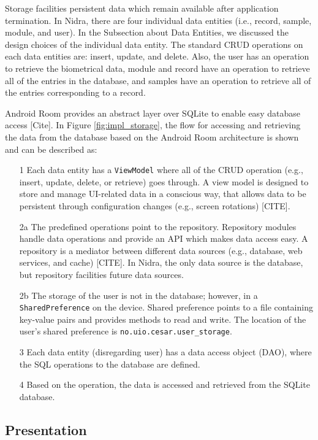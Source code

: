 Storage facilities persistent data which remain available after application termination. In Nidra, there are four individual data entities (i.e., record, sample, module, and user). In the Subsection about Data Entities, we discussed the design choices of the individual data entity. The standard CRUD operations on each data entities are: insert, update, and delete. Also, the user has an operation to retrieve the biometrical data, module and record have an operation to retrieve all of the entries in the database, and samples have an operation to retrieve all of the entries corresponding to a record. 

Android Room provides an abstract layer over SQLite to enable easy database access [Cite]. In Figure \ref{fig:impl_storage}, the flow for accessing and retrieving the data from the database based on the Android Room architecture is shown and can be described as:

\begin{itemize}
	\item[1] Each data entity has a \verb|ViewModel| where all of the CRUD operation (e.g., insert, update, delete, or retrieve) goes through.  A view model is designed to store and manage UI-related data in a conscious way, that allows data to be persistent through configuration changes (e.g., screen rotations) [CITE]. 
 	\item[2a] The predefined operations point to the repository. Repository modules handle data operations and provide an API  which makes data access easy. A repository is a mediator between different data sources (e.g., database, web services, and cache) [CITE]. In Nidra, the only data source is the database, but repository facilities future data sources. 
	\item[2b] The storage of the user is not in the database; however, in a \verb|SharedPreference| on the device. Shared preference points to a file containing key-value pairs and provides methods to read and write. The location of the user's shared preference is \verb|no.uio.cesar.user_storage|. 
	\item[3] Each data entity (disregarding user) has a data access object (DAO), where the SQL operations to the database are defined. 
	\item[4] Based on the operation, the data is accessed and retrieved from the SQLite database.
\end{itemize}



\subsection{Presentation}


